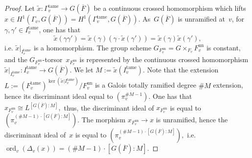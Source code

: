 \documentclass[a4paper,english,12pt]{amsart}
\newcommand{\oF}{\overline F}
\newcommand{\Fv}{F_v}
\newcommand{\piv}{\pi_v}
\DeclareMathOperator{\ord}{ord}
\DeclareMathOperator{\un}{un}
\DeclareMathOperator{\tame}{{tame}}
\numberwithin{equation}{subsection}
\begin{document}
\begin{proof}
Let $\widetilde x:\Gamma_v^{\tame}\to G(\overline F)$ be a continuous crossed homomorphism which lifts $x\in H^1(\Gamma_v, G(\overline F))=H^1(\Gamma_v^{\tame}, G(\overline F)).$ As~$G(\overline F)$ is unramified at~$v$, for $\gamma, \gamma'\in I_v^{\tame}$, one has that $$\widetilde x(\gamma\gamma')=\widetilde x(\gamma)(\gamma\cdot \widetilde x(\gamma'))=\widetilde x(\gamma)\widetilde x(\gamma'),$$i.e. $\widetilde x|_{I_v^{\tame}}$ is a homomorphism. The group scheme $G_{\Fv^{\un}}=G\times _{\Fv}\Fv^{\un}$ is constant, and the $G_{\Fv^{\un}}$-torsor~$x_{\Fv^{\un}}$ is represented by the continuous crossed homomorphism $\widetilde x|_{I_v^{\tame}}:I_v^{\tame}\to G(\overline F)$. We let $M:=\widetilde x(I_v^{\tame}).$ Note that the extension $L:=(\Fv^{\tame})^{\ker(\widetilde x|I^{\tame}_v)}/F_v^{\un}$ is a Galois totally ramified degree $\# M$ extension, hence its discriminant ideal equal to $(\piv^{\#M -1}).$ One has that $x_{\Fv^{\un}}\cong L^{[G(\oF):M]},$ thus, the discriminant ideal of $x_{\Fv^{\un}}$ is equal to $(\piv^{(\#M-1)\cdot [G(\oF):M] }).$ The morphism $x_{\Fv^{\un}}\to x$ is unramified, hence the discriminant ideal of~$x$ is equal to $(\piv^{(\# M-1)\cdot [G(\oF):M]}),$ i.e. $\ord_v(\Delta_v(x))=(\#M-1) \cdot [G(\oF):M].$


\end{proof}
\end{document}
